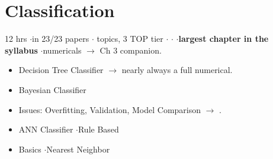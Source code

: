 \section{Classification}

{\color{sub}\footnotesize 12 hrs \gap$\cdot$\gap in 23/23 papers \gap$\cdot$ topics, 3 TOP tier \gap$\cdot$\gap {} \gap$\cdot$\gap {}
\gap$\cdot$\gap \textbf{largest chapter in the syllabus} \gap$\cdot$\gap numericals $\rightarrow$ Ch 3 companion.}

\begin{itemize}
  \item Decision Tree Classifier  \gap $\rightarrow$ nearly always a full numerical.
  \item Bayesian Classifier 
  \item Issues: Overfitting, Validation, Model Comparison  \gap $\rightarrow$
        .
  \item ANN Classifier  \gap $\cdot$\gap Rule Based 
  \item Basics  \gap $\cdot$\gap Nearest Neighbor 
\end{itemize}

\hr


{\color{sub}\footnotesize {} }

